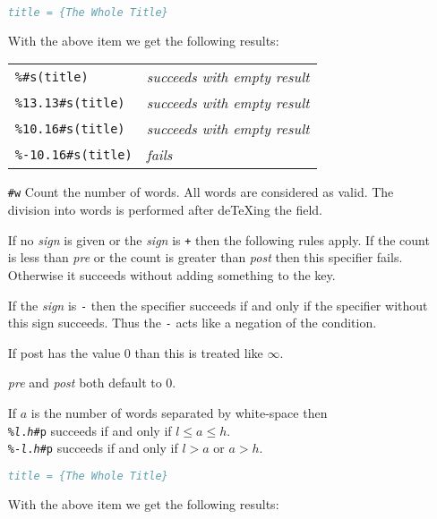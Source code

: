 \documentclass[11pt,a4paper]{scrbook}
\begin{document}
\begin{itemize}
    \begin{Example}
      \begin{lstlisting}[language=BibTeX]
  title = {The Whole Title}
      \end{lstlisting}\vspace{-2ex}
      With the above item we get the following results:

      \begin{tabular}{ll}
        \texttt{\%\#s(title)}		& \textit{succeeds with empty result}\\
        \texttt{\%13.13\#s(title)}	& \textit{succeeds with empty result}\\
        \texttt{\%10.16\#s(title)}	& \textit{succeeds with empty result}\\
        \texttt{\%-10.16\#s(title)}	& \textit{fails}
      \end{tabular}
    \end{Example}
 
  \item [\texttt{\#w}] Count the number of words. All words
    are considered as valid. The division into words is performed after
    de\TeX{}ing the field.

    If no \textit{sign} is given or the \textit{sign} is \verb|+| then the
    following rules apply. If the count is less than \textit{pre} or the count
    is greater than \textit{post} then this specifier fails. Otherwise it
    succeeds without adding something to the key.

    If the \textit{sign} is \verb|-| then the specifier succeeds if and only
    if the specifier without this sign succeeds. Thus the \verb|-| acts like a
    negation of the condition.

    If post has the value 0 than this is treated like \(\infty\).

    \textit{pre} and \textit{post} both default to 0.

    If \(a\) is the number of words separated by white-space then\\
    \texttt{\%\textit{l}.\textit{h}\#p} succeeds if and only if 
    \(l\leq a\leq h\).\\
    \texttt{\%-\textit{l}.\textit{h}\#p} succeeds if and only if 
    \(l>a\) or \(a>h\).

    \begin{Example}
      \begin{lstlisting}[language=BibTeX]
  title = {The Whole Title}
      \end{lstlisting}\vspace{-2ex}
      With the above item we get the following results:


\end{Example}
\end{itemize}
\end{document}
